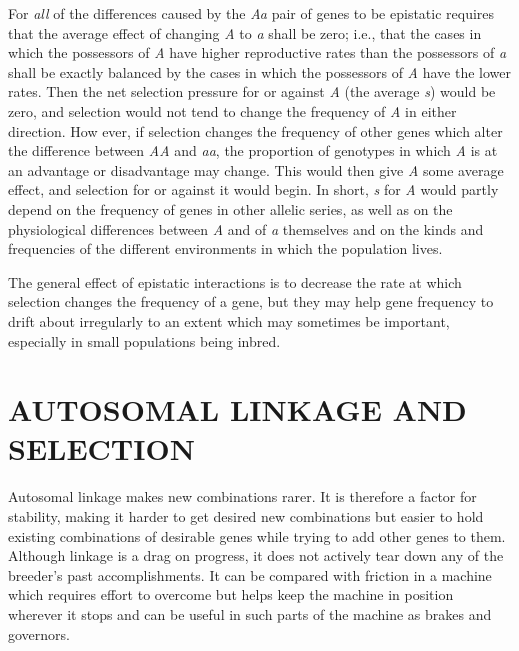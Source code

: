 For \textit{all} of the differences caused by the \textit{Aa} pair of genes to be epistatic
requires that the average effect of changing \textit{A} to \textit{a} shall be zero;
i.e., that the cases in which the possessors of \textit{A} have higher reproductive
rates than the possessors of \textit{a} shall be exactly balanced by the cases in
which the possessors of \textit{A} have the lower rates. Then the net selection
pressure for or against \textit{A} (the average \textit{s}) would be zero, and selection
would not tend to change the frequency of \textit{A} in either direction. How ever,
if selection changes the frequency of other genes which alter the
difference between \textit{AA} and \textit{aa}, the proportion of genotypes in which \textit{A}
is at an advantage or disadvantage may change. This would then give \textit{A}
some average effect, and selection for or against it would begin. In
short, \textit{s} for \textit{A} would partly depend on the frequency of genes in other
allelic series, as well as on the physiological differences between \textit{A} and
of \textit{a} themselves and on the kinds and frequencies of the different environments
in which the population lives.

The general effect of epistatic interactions is to decrease the rate at
which selection changes the frequency of a gene, but they may help gene
frequency to drift about irregularly to an extent which may sometimes
be important, especially in small populations being inbred.

\section*{AUTOSOMAL LINKAGE AND SELECTION}

Autosomal linkage makes new combinations rarer. It is therefore a
factor for stability, making it harder to get desired new combinations
but easier to hold existing combinations of desirable genes while trying
to add other genes to them. Although linkage is a drag on progress, it
does not actively tear down any of the breeder's past accomplishments.
It can be compared with friction in a machine which requires effort to
overcome but helps keep the machine in position wherever it stops and
can be useful in such parts of the machine as brakes and governors.

